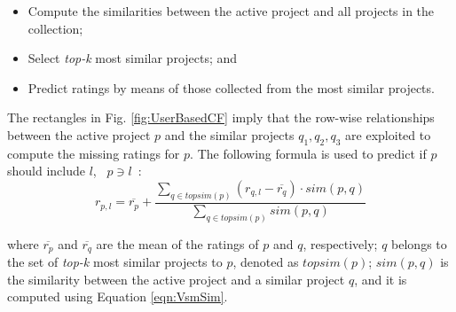\begin{itemize}
\item Compute the similarities between the active project and all projects in the collection;
\item Select \emph{top-k} most similar projects; and %
\item Predict ratings by means of those collected from the most similar projects.
\end{itemize}

The rectangles in Fig. \ref{fig:UserBasedCF} imply that the row-wise relationships between the active project $p$ and the similar projects $q_1,q_2,q_3$ are exploited to compute the missing ratings for $p$. The following formula is used to predict if $p$ should include $l$, \ie~$p \ni l$~\cite{DBLP:conf/rweb/NoiaO15}: %
\begin{equation} \label{eqn:Prediction}
r_{p,l}=\overline{r_{p}}+\frac{\sum_{q \in topsim(p)}(r_{q,l}-\overline{r_{q}})\cdot sim(p,q) }{\sum_{q \in topsim(p)} sim(p,q) } %
\end{equation}

\noindent
where $\overline{r_{p}}$ and $\overline{r_{q}}$ are the mean of the ratings of $p$ and $q$, respectively; $q$ belongs to the set of \emph{top-k} most similar projects to $p$, denoted as $topsim(p)$; $sim(p,q)$ is the similarity between the active project and a similar project $q$, and it is computed using Equation \ref{eqn:VsmSim}. %




